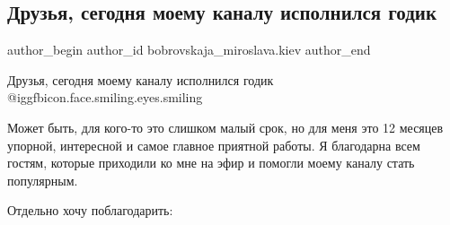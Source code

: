  
 
 
 
 
 
\subsection{Друзья, сегодня моему каналу исполнился годик}
\label{sec:01_12_2021.fb.bobrovskaja_miroslava.kiev.1.kanal_godovschina}
 
\ifcmt
 author_begin
   author_id bobrovskaja_miroslava.kiev
 author_end
\fi

Друзья, сегодня моему каналу исполнился годик @igg{fbicon.face.smiling.eyes.smiling} 

Может быть, для кого-то это слишком малый срок, но для меня это 12 месяцев
упорной, интересной и самое главное приятной работы. Я благодарна всем гостям,
которые приходили ко мне на эфир и помогли моему каналу стать популярным.

Отдельно хочу поблагодарить: 

